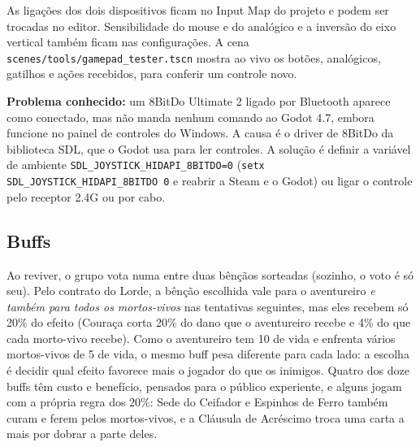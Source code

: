 \documentclass[11pt,a4paper]{article}
\begin{document}
As ligações dos dois dispositivos ficam no Input Map do projeto e podem ser trocadas no editor. Sensibilidade do mouse e do analógico e a inversão do eixo vertical também ficam nas configurações. A cena \texttt{scenes/tools/gamepad\_tester.tscn} mostra ao vivo os botões, analógicos, gatilhos e ações recebidos, para conferir um controle novo.

\textbf{Problema conhecido:} um 8BitDo Ultimate 2 ligado por Bluetooth aparece como conectado, mas não manda nenhum comando ao Godot 4.7, embora funcione no painel de controles do Windows. A causa é o driver de 8BitDo da biblioteca SDL, que o Godot usa para ler controles. A solução é definir a variável de ambiente \texttt{SDL\_JOYSTICK\_HIDAPI\_8BITDO=0} (\texttt{setx SDL\_JOYSTICK\_HIDAPI\_8BITDO 0} e reabrir a Steam e o Godot) ou ligar o controle pelo receptor 2.4G ou por cabo.

\subsection{Buffs}

Ao reviver, o grupo vota numa entre duas bênçãos sorteadas (sozinho, o voto é só seu). Pelo contrato do Lorde, a bênção escolhida vale para o aventureiro \emph{e também para todos os mortos-vivos} nas tentativas seguintes, mas eles recebem só 20\% do efeito (Couraça corta 20\% do dano que o aventureiro recebe e 4\% do que cada morto-vivo recebe). Como o aventureiro tem 10 de vida e enfrenta vários mortos-vivos de 5 de vida, o mesmo buff pesa diferente para cada lado: a escolha é decidir qual efeito favorece mais o jogador do que os inimigos. Quatro dos doze buffs têm custo e benefício, pensados para o público experiente, e alguns jogam com a própria regra dos 20\%: Sede do Ceifador e Espinhos de Ferro também curam e ferem pelos mortos-vivos, e a Cláusula de Acréscimo troca uma carta a mais por dobrar a parte deles.
\end{document}

